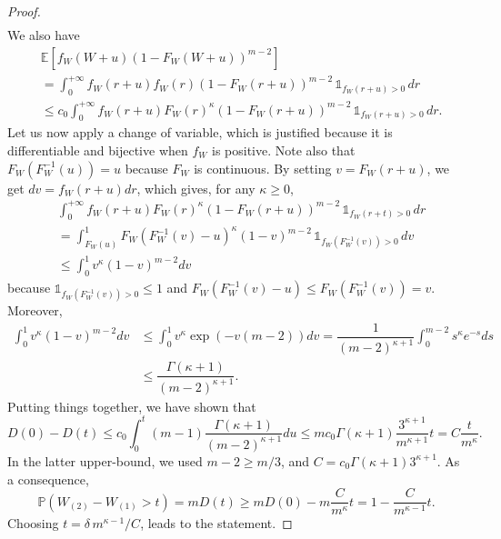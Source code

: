 \documentclass[10pt,a4paper]{amsart}
\newcommand{\PP}{\mathbb{P}}
\newcommand{\ind}{\mathds{1}}
\begin{document}
\begin{proof}
\begin{align*}
\end{align*}
We also have
\begin{align*}
      & \mathbb{E}[f_W(W+u)(1- F_W ( W + u ))^{m-2}] \\ &=   \int_0^{+\infty} f_W(r+u)f_W(r)(1- F_W ( r + u ))^{m-2} \, \ind_{f_W(r+u) > 0} \, dr \\
    & \leq  c_0 \int_0^{+\infty} f_W(r+u)  F_W(r)^\kappa (1- F_W ( r + u ))^{m-2} \, \ind_{f_W(r+u) > 0} \, dr.
\end{align*}
Let us now apply a change of variable, which is justified because it is differentiable and bijective when $f_W$ is positive. Note also that $ F _W ( F_W^{-1} (u)) = u$ because $F_W$ is continuous. By setting $v=F_W(r+u)$, we get $dv=f_W(r+u)dr$, which gives, for any $\kappa \geq 0$,
\begin{align*}
    &\int_0^{+\infty} f_W(r+u)  F_W(r)^\kappa (1- F_W ( r + u ))^{m-2}\, \ind_{f_W(r+t) > 0} \, dr \\ &= \int_{F_W(u)}^{1}  F_W(F_W^{-1}(v)-u)^\kappa (1- v)^{m-2} \, \ind_{f_W(F^{-1}_W(v)) > 0} \, dv \\ &\leq  \int_{0}^{1} v^\kappa (1- v)^{m-2}dv 
\end{align*}
because $\ind_{f_W(F^{-1}_W(v)) > 0} \leq 1$ and $ F_W(F_W^{-1}(v)-u) \leq F_W(F_W^{-1}(v)) = v.$
Moreover,
\begin{align*}
\int_{0}^{1} v^\kappa (1- v)^{m-2}dv &\leq \int_{0}^{1} v^\kappa \exp(-v(m-2)) dv = \dfrac{1}{(m-2)^{\kappa+1}}\int_{0}^{m-2} s^\kappa e^{-s} ds \\ &\leq \dfrac{\Gamma(\kappa+1)}{(m-2)^{\kappa+1}}.
\end{align*}
Putting things together, we have shown that
$$D(0) - D(t) \leq c_0 \int_{0}^t (m-1)  \dfrac{\Gamma(\kappa+1)}{(m-2)^{\kappa+1}} du \leq m c_0 \Gamma(\kappa+1) \dfrac{3^{\kappa+1}}{m^{\kappa+1}} t = C \dfrac{t}{m^\kappa}.$$
In the latter upper-bound, we used $m-2 \geq m/3$, and $C = c_0 \Gamma(\kappa+1) 3^{\kappa+1}$. As a consequence, $$\PP\left(W_{(2)} -W_{(1)}   > t \right) = m D(t) \geq m D(0) - m \dfrac{C}{m^\kappa} t =   1 - \dfrac{C}{m^{\kappa-1}} t.$$
Choosing $t = { \delta  \, m^{\kappa-1}} / {C}$, leads to the statement.
\end{proof}
\end{document}

